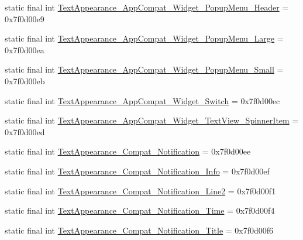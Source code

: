 \begin{DoxyCompactItemize}
\item 
static final int \mbox{\hyperlink{classandroid_1_1support_1_1v7_1_1appcompat_1_1_r_1_1style_a6429436d9eea603ce9b9fbafd23187e7}{Text\+Appearance\+\_\+\+App\+Compat\+\_\+\+Widget\+\_\+\+Popup\+Menu\+\_\+\+Header}} = 0x7f0d00e9
\item 
static final int \mbox{\hyperlink{classandroid_1_1support_1_1v7_1_1appcompat_1_1_r_1_1style_acddbaf164ab34ab838b8cd518569c0c7}{Text\+Appearance\+\_\+\+App\+Compat\+\_\+\+Widget\+\_\+\+Popup\+Menu\+\_\+\+Large}} = 0x7f0d00ea
\item 
static final int \mbox{\hyperlink{classandroid_1_1support_1_1v7_1_1appcompat_1_1_r_1_1style_a0bd9421bc05565e838564318f68e8109}{Text\+Appearance\+\_\+\+App\+Compat\+\_\+\+Widget\+\_\+\+Popup\+Menu\+\_\+\+Small}} = 0x7f0d00eb
\item 
static final int \mbox{\hyperlink{classandroid_1_1support_1_1v7_1_1appcompat_1_1_r_1_1style_a044e8db0d422a2d88ab08436b642f8f1}{Text\+Appearance\+\_\+\+App\+Compat\+\_\+\+Widget\+\_\+\+Switch}} = 0x7f0d00ec
\item 
static final int \mbox{\hyperlink{classandroid_1_1support_1_1v7_1_1appcompat_1_1_r_1_1style_a7122ada05dc3c4ad71c8ed067b0bf22e}{Text\+Appearance\+\_\+\+App\+Compat\+\_\+\+Widget\+\_\+\+Text\+View\+\_\+\+Spinner\+Item}} = 0x7f0d00ed
\item 
static final int \mbox{\hyperlink{classandroid_1_1support_1_1v7_1_1appcompat_1_1_r_1_1style_aac60ecef7312e109dcc9fe0fbf8c0631}{Text\+Appearance\+\_\+\+Compat\+\_\+\+Notification}} = 0x7f0d00ee
\item 
static final int \mbox{\hyperlink{classandroid_1_1support_1_1v7_1_1appcompat_1_1_r_1_1style_a8ca4f22679fe248d69f61337252841f9}{Text\+Appearance\+\_\+\+Compat\+\_\+\+Notification\+\_\+\+Info}} = 0x7f0d00ef
\item 
static final int \mbox{\hyperlink{classandroid_1_1support_1_1v7_1_1appcompat_1_1_r_1_1style_ae26dbfc3e8f5073f7f43edd613571b9c}{Text\+Appearance\+\_\+\+Compat\+\_\+\+Notification\+\_\+\+Line2}} = 0x7f0d00f1
\item 
static final int \mbox{\hyperlink{classandroid_1_1support_1_1v7_1_1appcompat_1_1_r_1_1style_a0a4bcb87b0dbd416599a5247ad7d17f3}{Text\+Appearance\+\_\+\+Compat\+\_\+\+Notification\+\_\+\+Time}} = 0x7f0d00f4
\item 
static final int \mbox{\hyperlink{classandroid_1_1support_1_1v7_1_1appcompat_1_1_r_1_1style_a40ea1e59705aa63b129589fdb1a5fc10}{Text\+Appearance\+\_\+\+Compat\+\_\+\+Notification\+\_\+\+Title}} = 0x7f0d00f6
\item 

\end{DoxyCompactItemize}
